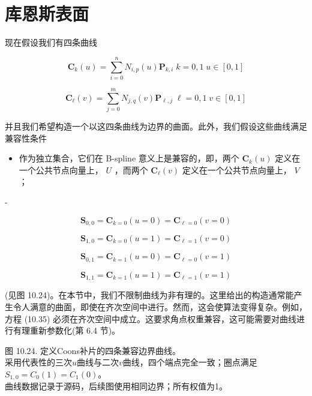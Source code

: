 \documentclass[../main.tex]{subfiles}
\begin{document}
\section{库恩斯表面}

现在假设我们有四条曲线

\[
{\mathbf{C}}_{k}\left( u\right)  = \mathop{\sum }\limits_{{i = 0}}^{n}{N}_{i,p}\left( u\right) {\mathbf{P}}_{k,i}\;k = 0,1\;u \in  \left\lbrack  {0,1}\right\rbrack
\]

\[
{\mathbf{C}}_{\ell }\left( v\right)  = \mathop{\sum }\limits_{{j = 0}}^{m}{N}_{j,q}\left( v\right) {\mathbf{P}}_{\ell ,j}\;\ell  = 0,1\;v \in  \left\lbrack  {0,1}\right\rbrack   \tag{10.34}
\]

并且我们希望构造一个以这四条曲线为边界的曲面。此外，我们假设这些曲线满足兼容性条件

\begin{itemize}
\item 作为独立集合，它们在 B-spline 意义上是兼容的，即，两个 \({\mathbf{C}}_{k}\left( u\right)\) 定义在一个公共节点向量上， \(U\) ，而两个 \({\mathbf{C}}_{\ell }\left( v\right)\) 定义在一个公共节点向量上， \(V\) ；
\end{itemize}

-

\[
{\mathbf{S}}_{0,0} = {\mathbf{C}}_{k = 0}\left( {u = 0}\right)  = {\mathbf{C}}_{\ell  = 0}\left( {v = 0}\right)
\]

\[
{\mathbf{S}}_{1,0} = {\mathbf{C}}_{k = 0}\left( {u = 1}\right)  = {\mathbf{C}}_{\ell  = 1}\left( {v = 0}\right)
\]

\[
{\mathbf{S}}_{0,1} = {\mathbf{C}}_{k = 1}\left( {u = 0}\right)  = {\mathbf{C}}_{\ell  = 0}\left( {v = 1}\right)
\]

\[
{\mathbf{S}}_{1,1} = {\mathbf{C}}_{k = 1}\left( {u = 1}\right)  = {\mathbf{C}}_{\ell  = 1}\left( {v = 1}\right)  \tag{10.35}
\]

(见图 10.24)。在本节中，我们不限制曲线为非有理的。这里给出的构造通常能产生令人满意的曲面，即使在齐次空间中进行。然而，这会使算法变得复杂。例如，方程 (10.35) 必须在齐次空间中成立。这要求角点权重兼容，这可能需要对曲线进行有理重新参数化(第 6.4 节)。

\begin{center}
\begin{minipage}{24cm}
\centering
{}
\par\smallskip
图 10.24. 定义Coons补片的四条兼容边界曲线。\\
采用代表性的三次$u$曲线与二次$v$曲线，四个端点完全一致；圈点满足$S_{1,0}=C_0(1)=C_1(0)$。\\
曲线数据记录于源码，后续图使用相同边界；所有权值为1。
\end{minipage}
\end{center}
\end{document}
